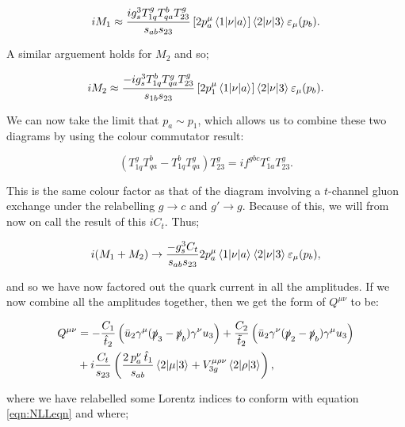 \begin{equation}
iM_1 \approx \frac{i g_s^3 T^g_{1q}T^b_{qa}T^g_{23}}{s_{ab}s_{23}} \left[ 2p_a^\mu \mathinner{\langle1\vert\nu\vert a\rangle}_{} \right] \mathinner{\langle2\vert\nu\vert3\rangle}_{} \varepsilon_\mu (p_b).
\end{equation}

A similar arguement holds for $M_2$ and so;

\begin{equation}
iM_2 \approx \frac{-i g_s^3 T^b_{1q}T^g_{qa}T^g_{23}}{s_{1b}s_{23}} \left[ 2p_1^\mu \mathinner{\langle1\vert\nu\vert a\rangle}_{} \right] \mathinner{\langle2\vert\nu\vert3\rangle}_{} \varepsilon_\mu (p_b).
\end{equation}

We can now take the limit that $p_a \sim p_1$, which allows us to combine these two diagrams by using the colour commutator result:

\begin{equation}
(T^g_{1q}T^b_{qa}- T^b_{1q}T^g_{qa})T^g_{23} = i f^{gbc}T^c_{1a}T^g_{23}.
\end{equation}

This is the same colour factor as that of the diagram involving a $t$-channel gluon exchange under the relabelling $g \to c$ and $g' \to g$. Because of this, we will from now on call the result of this $i C_t$. Thus;

\begin{equation}
i(M_1 + M_2) \to \frac{- g_s^3 C_t}{s_{ab}s_{23}}2p_a^\mu \mathinner{\langle1\vert\nu\vert a\rangle}_{} \mathinner{\langle2\vert\nu\vert3\rangle}_{} \varepsilon_\mu (p_b),
\end{equation}

and so we have now factored out the quark current in all the amplitudes. If we now combine all the amplitudes together, then we get the form of $Q^{\mu \nu}$ to be:

\begin{equation}
\begin{split}
Q^{\mu \nu} &= -\frac{C_1}{\hat{t}_2} \left(\bar{u}_2 \gamma^\mu (\slashed{p}_3-\slashed{p}_b)\gamma^\nu u_3 \right) + \frac{C_2}{\tilde{t}_2} \left( \bar{u}_2 \gamma^\nu (\slashed{p}_2-\slashed{p}_b) \gamma^\mu u_3 \right) \\
&+ i  \frac{C_t}{s_{23}} \left(\frac{2 \hspace{2pt} p_a^\nu \hspace{2pt} \hat{t}_1}{s_{ab}}  \mathinner{\langle2\vert\mu\vert3\rangle}_{} + V^{\mu \rho \nu}_{3g}  \mathinner{\langle2\vert\rho\vert3\rangle}_{} \right),
\end{split}
\end{equation}

where we have relabelled some Lorentz indices to conform with equation \ref{eqn:NLLeqn} and where;

